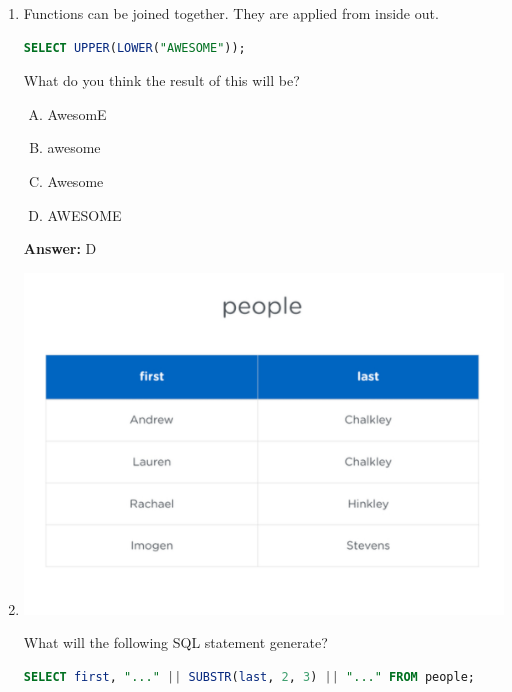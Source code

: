 \documentclass[12pt]{article}
\begin{document}
\begin{enumerate}[1.]
    \item

    Functions can be joined together. They are applied from inside out.

    \begin{lstlisting}[language=SQL]
    SELECT UPPER(LOWER("AWESOME"));
    \end{lstlisting}

    What do you think the result of this will be?

    \bigskip

    \begin{enumerate}[A.]
        \item AwesomE
        \item awesome
        \item Awesome
        \item AWESOME
    \end{enumerate}

    \textbf{Answer:} D

    \item

    \begin{center}
    \includegraphics[width=0.8 \linewidth]{images/part_2_notes_4.png}
    \end{center}

    \bigskip

    What will the following SQL statement generate?

    \bigskip

    \begin{lstlisting}[language=SQL]
    SELECT first, "..." || SUBSTR(last, 2, 3) || "..." FROM people;
    \end{lstlisting}

    \bigskip


\end{enumerate}
\end{document}

